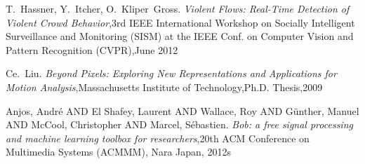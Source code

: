\cleardoublepage
{}
{}
\begin{thebibliography}{99}

T.~Hassner, Y.~Itcher, O.~Kliper~Gross. \emph{Violent Flows: Real-Time Detection of Violent Crowd Behavior},3rd IEEE International Workshop on Socially Intelligent Surveillance and Monitoring (SISM) at the IEEE Conf. on Computer Vision and Pattern Recognition (CVPR),June 2012

Ce.~Liu. \emph{Beyond Pixels: Exploring New Representations and Applications for Motion Analysis},Massachusetts Institute of Technology,Ph.D. Thesis,2009

Anjos, Andr\'e AND El Shafey, Laurent AND Wallace, Roy AND G\"unther, Manuel AND McCool, Christopher AND Marcel, S\'ebastien. \emph{Bob: a free signal processing and machine learning toolbox for researchers},20th ACM Conference on Multimedia Systems (ACMMM), Nara Japan, 2012s


\end{thebibliography}
